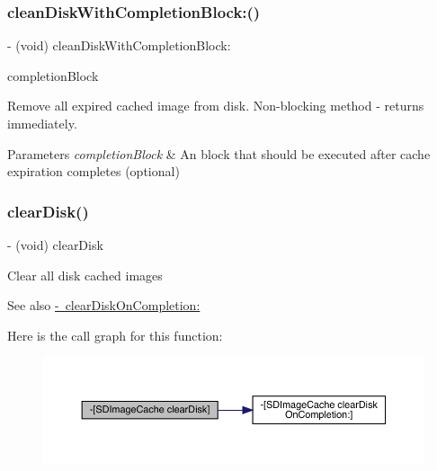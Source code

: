 \subsubsection{\texorpdfstring{clean\+Disk\+With\+Completion\+Block\+:()}{cleanDiskWithCompletionBlock:()}\hspace{0.1cm}{\footnotesize\ttfamily [3/3]}}
{\footnotesize\ttfamily -\/ (void) clean\+Disk\+With\+Completion\+Block\+: \begin{DoxyParamCaption}\item[{(S\+D\+Web\+Image\+No\+Params\+Block)}]{completion\+Block }\end{DoxyParamCaption}}

Remove all expired cached image from disk. Non-\/blocking method -\/ returns immediately. 
\begin{DoxyParams}{Parameters}
{\em completion\+Block} & An block that should be executed after cache expiration completes (optional) \\
\hline
\end{DoxyParams}
\mbox{\label{interface_s_d_image_cache_a2a9bcc872d749959df5dd458247b3301}} 
\subsubsection{\texorpdfstring{clear\+Disk()}{clearDisk()}\hspace{0.1cm}{\footnotesize\ttfamily [1/3]}}
{\footnotesize\ttfamily -\/ (void) clear\+Disk \begin{DoxyParamCaption}{ }\end{DoxyParamCaption}}

Clear all disk cached images \begin{DoxySeeAlso}{See also}
\mbox{\hyperlink{interface_s_d_image_cache_ab936a83a1b711209d30f9051cc3658cc}{-\/ clear\+Disk\+On\+Completion\+:}} 
\end{DoxySeeAlso}
Here is the call graph for this function\+:\nopagebreak
\begin{figure}[H]
\begin{center}
\leavevmode
\includegraphics[width=350pt]{interface_s_d_image_cache_a2a9bcc872d749959df5dd458247b3301_cgraph}
\end{center}
\end{figure}
\mbox{\label{interface_s_d_image_cache_a2a9bcc872d749959df5dd458247b3301}} 
